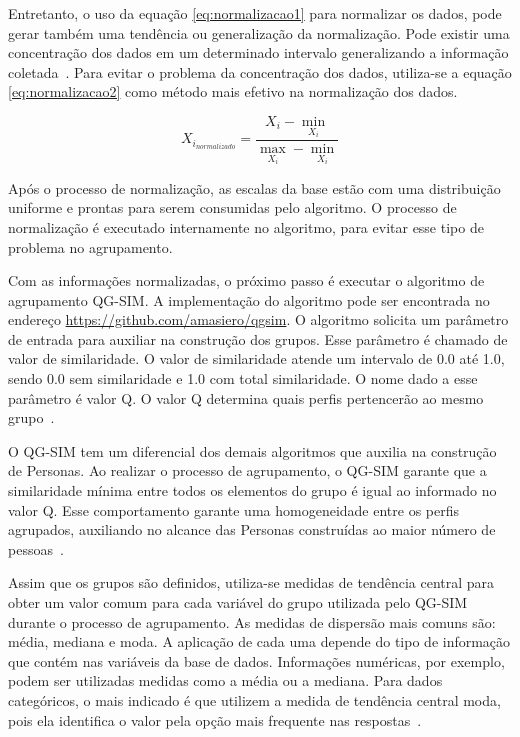 Entretanto, o uso da equação \ref{eq:normalizacao1} para normalizar os dados, pode gerar também uma tendência ou generalização da normalização. Pode existir uma concentração dos dados em um determinado intervalo generalizando a informação coletada~\cite{masiero:2013, masiero:2013a, masiero:2013b}. Para evitar o problema da concentração dos dados, utiliza-se a equação \ref{eq:normalizacao2} como método mais efetivo na normalização dos dados.

\begin{equation}
	X_{i_{normalizado}} = \frac{X_i - \min_{X_i}}{\max_{X_i} - \min_{X_i}}
	\label{eq:normalizacao2}
\end{equation}

Após o processo de normalização, as escalas da base estão com uma distribuição uniforme e prontas para serem consumidas pelo algoritmo. O processo de normalização é executado internamente no algoritmo, para evitar esse tipo de problema no agrupamento.

Com as informações normalizadas, o próximo passo é executar o algoritmo de agrupamento QG-SIM. A implementação do algoritmo pode ser encontrada no endereço \url{https://github.com/amasiero/qgsim}. O algoritmo solicita um parâmetro de entrada para auxiliar na construção dos grupos. Esse parâmetro é chamado de valor de similaridade. O valor de similaridade atende um intervalo de 0.0 até 1.0, sendo 0.0 sem similaridade e 1.0 com total similaridade. O nome dado a esse parâmetro é valor Q. O valor Q determina quais perfis pertencerão ao mesmo grupo~\cite{masiero:2013}.

O QG-SIM tem um diferencial dos demais algoritmos que auxilia na construção de Personas. Ao realizar o processo de agrupamento, o QG-SIM garante que a similaridade mínima entre todos os elementos do grupo é igual ao informado no valor Q. Esse comportamento garante uma homogeneidade entre os perfis agrupados, auxiliando no alcance das Personas construídas ao maior número de pessoas~\cite{masiero:2013, masiero:2013a}.

Assim que os grupos são definidos, utiliza-se medidas de tendência central para obter um valor comum para cada variável do grupo utilizada pelo QG-SIM durante o processo de agrupamento. As medidas de dispersão mais comuns são: média, mediana e moda. A aplicação de cada uma depende do tipo de informação que contém nas variáveis da base de dados. Informações numéricas, por exemplo, podem ser utilizadas medidas como a média ou a mediana. Para dados categóricos, o mais indicado é que utilizem a medida de tendência central moda, pois ela identifica o valor pela opção mais frequente nas respostas~\cite{masiero:2011, masiero:2013a, masiero:2013b}.

